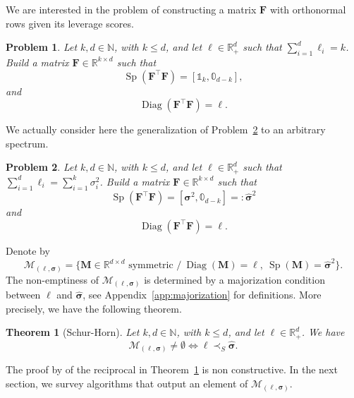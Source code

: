\documentclass[twoside,11pt]{book}
\newtheorem{theorem}{Theorem}
\newtheorem{problem}{Problem}
\numberwithin{theorem}{chapter}
\numberwithin{definition}{chapter}
\numberwithin{proposition}{chapter}
\numberwithin{corollary}{chapter}
\numberwithin{example}{chapter}
\numberwithin{lemma}{chapter}
\numberwithin{assumption}{chapter}
\DeclareMathOperator{\Sp}{\mathrm{Sp}}
\DeclareMathOperator{\Diag}{\mathrm{Diag}}
\DeclareMathOperator{\Tran}{\intercal}
\begin{document}
We are interested in the problem of constructing a matrix $\bm{F}$ with orthonormal rows given its leverage scores.
\begin{problem}\label{prob:orthogonal_frame_existence}
Let $k,d \in \mathbb{N}$, with $k \leq d$, and let $\bm{\ell} \in \mathbb{R}_{+}^{d}$ such that $\sum\limits_{i =1}^{d} \ell_{i} = k$. Build a matrix $\bm{F} \in \mathbb{R}^{k\times d}$ such that
\begin{equation}
\Sp(\bm{F}^{\Tran}\bm{F}) = [\mathbb{1}_{k},\mathbb{0}_{d-k}],
\end{equation}
and
\begin{equation}
\Diag(\bm{F}^{\Tran}\bm{F}) = \bm{\ell}.
\end{equation}
\end{problem}
We actually consider here the generalization of Problem~\ref{prob:general_frame_existence} to an arbitrary spectrum.

\begin{problem}\label{prob:general_frame_existence}
Let $k,d \in \mathbb{N}$, with $k \leq d$, and let $\bm{\ell} \in \mathbb{R}_{+}^{d}$ such that $\sum\limits_{i =1}^{d} \ell_{i} = \sum\limits_{i = 1}^{k} \sigma_{i}^2$. Build a matrix $\bm{F} \in \mathbb{R}^{k\times d}$ such that
\begin{equation}
\Sp(\bm{F}^{\Tran}\bm{F}) = [\bm{\sigma}^2,\mathbb{0}_{d-k}] =:\bm{\hat\sigma}^2
\end{equation}
and
\begin{equation}
\Diag(\bm{F}^{\Tran}\bm{F}) = \bm{\ell}.
\end{equation}
\end{problem}

Denote by
\begin{equation}
\mathcal{M}_{(\bm{\ell},\bm{\sigma})} =  \{ \bm{M} \in \mathbb{R}^{d\times d}\text{ symmetric } \big/~  \Diag(\bm{M}) = \bm{\ell}, ~\Sp(\bm{M}) = \bm{\hat{\sigma}}^2\}.
\end{equation}
The non-emptiness of $\mathcal{M}_{(\bm{\ell},\bm{\sigma})}$ is determined by a majorization condition between $\bm{\ell}$ and $\hat{\bm{\sigma}}$, see Appendix~\ref{app:majorization} for definitions. More precisely, we have the following theorem.
\begin{theorem}[Schur-Horn]\label{thm:majorization_equivalence}
Let $k,d \in \mathbb{N}$, with $k \leq d$, and let $\bm{\ell} \in \mathbb{R}_{+}^{d}$. We have
\begin{equation}\label{eq:nonemptiness_majorization_equivalence}
\mathcal{M}_{(\bm{\ell},\bm{\sigma})} \neq \emptyset \Leftrightarrow \bm{\ell} \prec_{S} \hat{\bm{\sigma}}.
\end{equation}
\end{theorem}
The proof by \cite{Hor54} of the reciprocal in Theorem~\ref{thm:majorization_equivalence} is non constructive. In the next section, we survey algorithms that output an element of $\mathcal{M}_{(\bm{\ell},\bm{\sigma})}$.
\end{document}
